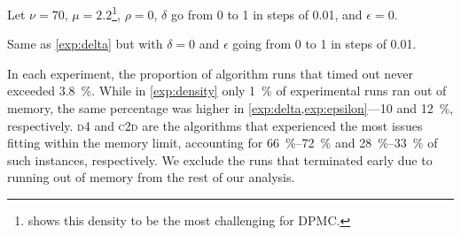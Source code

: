 \begin{experiment}[$\delta$]\label{exp:delta}
  Let $\nu = 70$, $\mu = 2.2$\footnote{ shows this density to
    be the most challenging for \textsc{DPMC}.},
  $\rho = 0$, $\delta$ go from 0 to 1 in steps of 0.01, and $\epsilon = 0$.
\end{experiment}

\begin{experiment}[$\epsilon$]\label{exp:epsilon}
  Same as \cref{exp:delta} but with $\delta = 0$ and $\epsilon$ going from 0 to
  1 in steps of 0.01.
\end{experiment}

In each experiment, the proportion of algorithm runs that timed out never
exceeded \SI{3.8}{\percent}. While in \cref{exp:density} only \SI{1}{\percent}
of experimental runs ran out of memory, the same percentage was higher in
\cref{exp:delta,exp:epsilon}---10 and \SI{12}{\percent}, respectively.
\textsc{d4} \citep{DBLP:conf/ijcai/LagniezM17} and
\textsc{c2d} are the algorithms that
experienced the most issues fitting within the memory limit, accounting for
\SIrange{66}{72}{\percent} and \SIrange{28}{33}{\percent} of such instances,
respectively. We exclude the runs that terminated early due to running out of
memory from the rest of our analysis.

